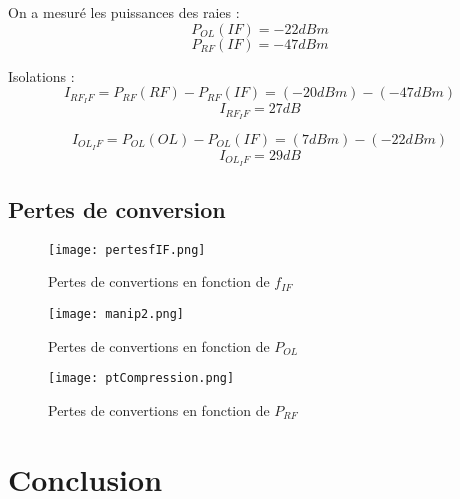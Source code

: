 \documentclass[oneside,a4paper,12pt]{article}
\begin{document}
	On a mesuré les puissances des raies :
	\[ P_{OL}(IF) = -22dBm \]
	\[ P_{RF}(IF) = -47dBm \]

	Isolations :
	\[ I_{RF_IF} = P_{RF}(RF) - P_{RF}(IF) = (-20 dBm) - (-47 dBm) \]
	\[ I_{RF_IF} = 27 dB \]

	\[ I_{OL_IF} = P_{OL}(OL) - P_{OL}(IF) = (7 dBm) - (-22 dBm) \]
	\[ I_{OL_IF} = 29 dB \]

	\subsection{Pertes de conversion}

	\begin{figure}[h]
		\centering
		\texttt{[image: pertesfIF.png]}	
		\caption{Pertes de convertions en fonction de $f_{IF}$}
	\end{figure}
	
	\begin{figure}[h]
		\centering
		\texttt{[image: manip2.png]}	
		\caption{Pertes de convertions en fonction de $P_{OL}$}
	\end{figure}

	\begin{figure}[h]
		\centering
		\texttt{[image: ptCompression.png]}	
		\caption{Pertes de convertions en fonction de $P_{RF}$}
	\end{figure}

	\newpage
	\section{Conclusion}
\end{document}
